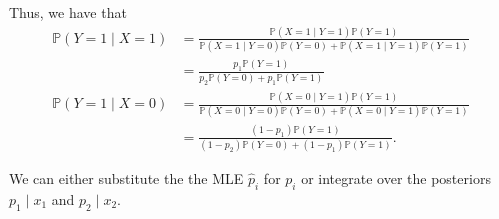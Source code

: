 \documentclass[letterpaper,11pt]{article}
\begin{document}
\begin{enumerate}
\begin{enumerate}
\begin{description}
      Thus, we have that
      \begin{align*}
        \mathbb{P}\left(Y = 1 \mid X = 1\right)
        &= \frac{\mathbb{P}\left(X = 1 \mid Y = 1\right)\mathbb{P}\left(Y = 1\right)}
          {\mathbb{P}\left(X = 1 \mid Y = 0\right)\mathbb{P}\left(Y = 0\right) +
          \mathbb{P}\left(X = 1 \mid Y = 1\right)\mathbb{P}\left(Y = 1\right)} \\
        &= \frac{p_1\mathbb{P}\left(Y = 1\right)}
          {p_2\mathbb{P}\left(Y = 0\right) + p_1\mathbb{P}\left(Y = 1\right)} \\
        \mathbb{P}\left(Y = 1 \mid X = 0\right)
        &= \frac{\mathbb{P}\left(X = 0 \mid Y = 1\right)\mathbb{P}\left(Y = 1\right)}
          {\mathbb{P}\left(X = 0 \mid Y = 0\right)\mathbb{P}\left(Y = 0\right) +
          \mathbb{P}\left(X = 0 \mid Y = 1\right)\mathbb{P}\left(Y = 1\right)} \\
        &= \frac{\left(1 - p_1\right)\mathbb{P}\left(Y = 1\right)}
          {\left(1 - p_2 \right)\mathbb{P}\left(Y = 0\right) + \left(1 - p_1\right)\mathbb{P}\left(Y = 1\right)}.
      \end{align*}

      We can either substitute the the MLE $\hat{p}_i$ for $p_i$ or integrate
      over the posteriors $p_1 \mid x_1$ and $p_2 \mid x_2$.


\end{description}
\end{enumerate}
\end{enumerate}
\end{document}
